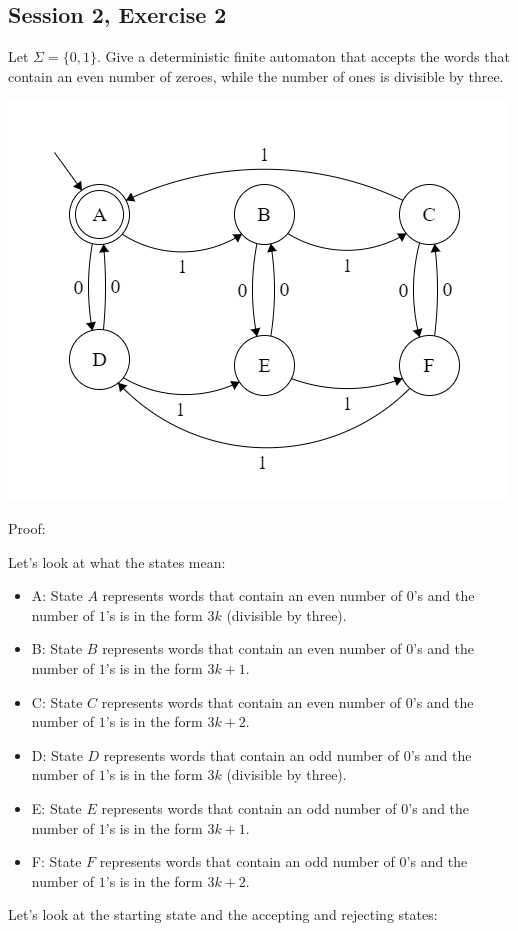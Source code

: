 \subsection{Session 2, Exercise 2}


Let $\Sigma=\{0,1\}$. Give a deterministic finite automaton that accepts the words that contain an even number of zeroes, while the number of ones is divisible by three.



\includegraphics[width=0.5\linewidth]{02/2_2.png}

Proof:

Let's look at what the states mean:

\begin{itemize}
    \item A: State $A$ represents words that contain an even number of $0$'s and the number of $1$'s is in the form $3k$ (divisible by three).
    \item B: State $B$ represents words that contain an even number of $0$'s and the number of $1$'s is in the form $3k+1$.
    \item C: State $C$ represents words that contain an even number of $0$'s and the number of $1$'s is in the form $3k+2$.
    \item D: State $D$ represents words that contain an odd number of $0$'s and the number of $1$'s is in the form $3k$ (divisible by three).
    \item E: State $E$ represents words that contain an odd number of $0$'s and the number of $1$'s is in the form $3k+1$.
    \item F: State $F$ represents words that contain an odd number of $0$'s and the number of $1$'s is in the form $3k+2$.
\end{itemize}

Let's look at the starting state and the accepting and rejecting states:

